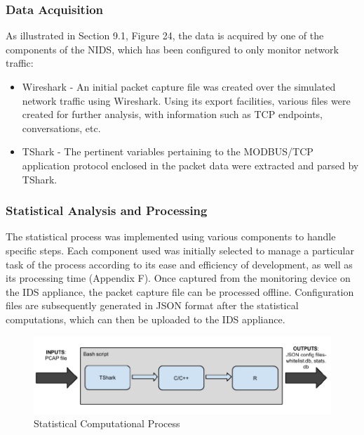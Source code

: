 \documentclass[11pt,]{article}
\begin{document}
\subsubsection{Data Acquisition}\label{data-acquisition}

As illustrated in Section 9.1, Figure 24, the data is acquired by one of
the components of the NIDS, which has been configured to only monitor
network traffic:

\begin{itemize}
\itemsep1pt\parskip0pt
\item
  Wireshark - An initial packet capture file was created over the
  simulated network traffic using Wireshark. Using its export
  facilities, various files were created for further analysis, with
  information such as TCP endpoints, conversations, etc.
\item
  TShark - The pertinent variables pertaining to the MODBUS/TCP
  application protocol enclosed in the packet data were extracted and
  parsed by TShark.
\end{itemize}

\subsubsection{Statistical Analysis and
Processing}\label{statistical-analysis-and-processing}

The statistical process was implemented using various components to
handle specific steps. Each component used was initially selected to
manage a particular task of the process according to its ease and
efficiency of development, as well as its processing time (Appendix F).
Once captured from the monitoring device on the IDS appliance, the
packet capture file can be processed offline. Configuration files are
subsequently generated in JSON format after the statistical
computations, which can then be uploaded to the IDS appliance.

\begin{figure}[h]

{\centering \includegraphics{thesis_files/figure-latex/unnamed-chunk-38-1} 

}

\caption{Statistical Computational Process}\label{fig:unnamed-chunk-38}
\end{figure}
\end{document}
